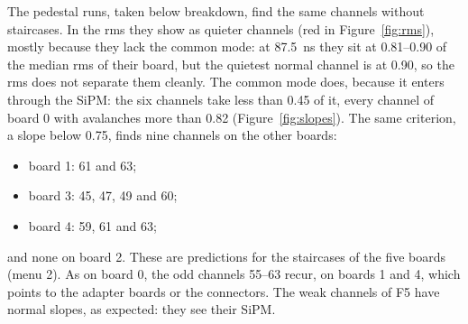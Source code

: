 \documentclass[11pt,a4paper]{article}
\begin{document}
The pedestal runs, taken below breakdown, find the same channels without staircases. In the
rms they show as quieter channels (red in Figure~\ref{fig:rms}), mostly because they lack the
common mode: at 87.5~ns they sit at 0.81--0.90 of the median rms of their board, but the
quietest normal channel is at 0.90, so the rms does not separate them cleanly. The common mode
does, because it enters through the SiPM: the six channels take less than 0.45 of it, every
channel of board 0 with avalanches more than 0.82 (Figure~\ref{fig:slopes}). The same
criterion, a slope below 0.75, finds nine channels on the other boards:
\begin{itemize}
\item board 1: 61 and 63;
\item board 3: 45, 47, 49 and 60;
\item board 4: 59, 61 and 63;
\end{itemize}
and none on board 2. These are predictions for the staircases of the five boards (menu 2).
As on board 0, the odd channels 55--63 recur, on boards 1 and 4, which points to the adapter
boards or the connectors. The weak channels of F5 have normal slopes, as expected: they see
their SiPM.
\end{document}
